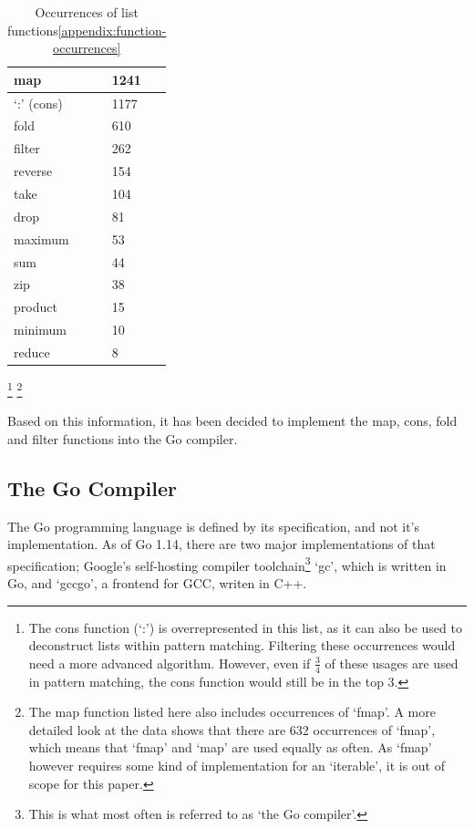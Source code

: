 \begin{table}[htb]
\centering
\caption{Occurrences of list functions\ref{appendix:function-occurrences}}\label{tab:occurrences-list-funcs}
\begin{tabular}{ll}
\toprule
map & 1241 \\
\midrule
`:' (cons) & 1177 \\
\midrule
fold & 610 \\
\midrule
filter & 262 \\
\midrule
reverse & 154 \\
\midrule
take & 104 \\
\midrule
drop & 81 \\
\midrule
maximum & 53 \\
\midrule
sum & 44 \\
\midrule
zip & 38 \\
\midrule
product & 15 \\
\midrule
minimum & 10 \\
\midrule
reduce & 8
\end{tabular}
\end{table}
\footnote{The cons function (`:') is overrepresented in this list,
    as it can also be used to deconstruct lists within pattern matching. Filtering
    these occurrences would need a more advanced algorithm. However, even if $\tfrac{3}{4}$
    of these usages are used in pattern matching, the cons function would still be
    in the top 3.
}
\footnote{The map function listed here also includes occurrences of `fmap'. A more
    detailed look at the data shows that there are 632 occurrences of `fmap', which
    means that `fmap' and `map' are used equally as often. As `fmap' however requires
    some kind of implementation for an `iterable', it is out of scope for this paper.
}

Based on this information, it has been decided to implement the map, cons, fold
and filter functions into the Go compiler.

\subsection{The Go Compiler}

The Go programming language is defined by its specification\autocite{go-spec}, and not
it's implementation. As of Go 1.14, there are two major implementations of that
specification; Google's self-hosting compiler toolchain\footnote{This is what most
    often is referred to as `the Go compiler'.}
`gc', which is written in Go, and `gccgo', a frontend for GCC, writen in C++.

